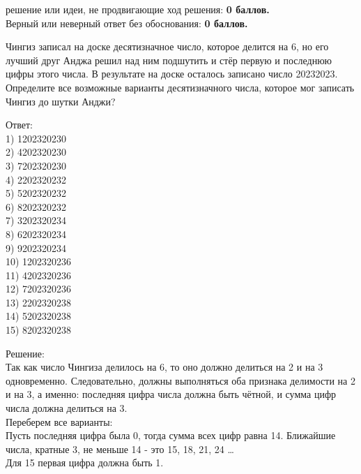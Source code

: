\newpage

\hspace{3mm}

 решение или идеи, не продвигающие ход решения: \textbf{0 баллов.}\\
Верный или неверный ответ без обоснования: \textbf{0 баллов.}

\hspace{3mm}


Чингиз записал на доске десятизначное число, которое делится на 6, но его лучший друг Анджа решил над ним подшутить и стёр первую и последнюю цифры этого числа. В результате на доске осталось записано число 20232023. Определите все возможные варианты десятизначного числа, которое мог записать Чингиз до шутки Анджи?

Ответ:\\
1) 1202320230\\
2) 4202320230\\
3) 7202320230\\
4) 2202320232\\
5) 5202320232\\
6) 8202320232\\ 
7) 3202320234\\
8) 6202320234\\
9) 9202320234\\ 
10) 1202320236\\
11) 4202320236\\
12) 7202320236\\ 
13) 2202320238\\
14) 5202320238\\
15) 8202320238

\hspace{3mm}

Решение:\\
Так как число Чингиза делилось на 6, то оно должно делиться на 2 и на 3 одновременно. Следовательно, должны выполняться оба признака делимости на 2 и на 3, а именно: последняя цифра числа должна быть чётной, и сумма цифр числа должна делиться на 3.\\
Переберем все варианты:\\
Пусть последняя цифра была 0, тогда сумма всех цифр равна 14. Ближайшие числа, кратные 3, не меньше 14 - это 15, 18, 21, 24 …\\
Для 15 первая цифра должна быть 1.

\newpage

\hspace{3mm}

